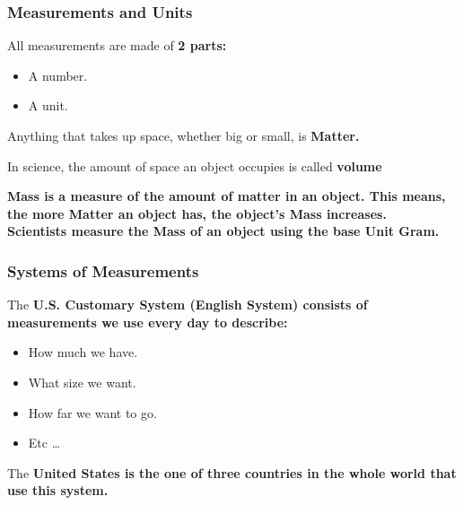 
\subsubsection*{Measurements and Units}

All measurements are made of \bf{2} parts:

\begin{itemize}
  \item A number.
  \item A unit.
\end{itemize}

\begin{definition}[Matter]
  Anything that takes up space, whether big or small, is \bf{Matter}.
\end{definition}

\begin{definition}[Volume]
  In science, the amount of space an object occupies is called \bf{volume}
\end{definition}

\begin{definition}[Mass]
  \bf{Mass} is a measure of the amount of matter in an object. This means, the more \bf{Matter} an object has, the object's \bf{Mass} increases. \\
  Scientists measure the \bf{Mass} of an object using the base \bf{Unit Gram}.
\end{definition}

\subsubsection*{Systems of Measurements}

The \bf{U.S. Customary System (English System)} consists of measurements we use every day to describe:

\begin{itemize}
  \item How much we have.
  \item What size we want.
  \item How far we want to go.
  \item Etc \ldots
\end{itemize}

The \bf{United States} is the one of three countries in the \bf{whole world} that use this system.

